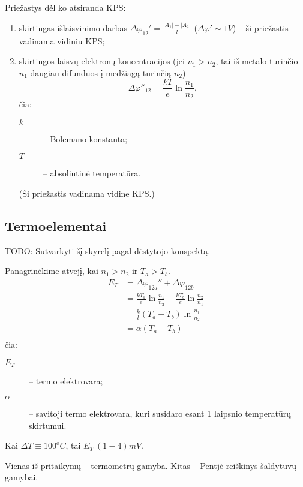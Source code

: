 Priežastys dėl ko atsiranda KPS:
\begin{enumerate}
  \item skirtingas išlaisvinimo darbas
    $\Delta \varphi_{12}' = \frac{|A_{1}| - |A_{2}|}{l}$
    ($\Delta \varphi' \sim 1 V$) – ši priežastis vadinama vidiniu KPS;
  \item skirtingos laisvų elektronų koncentracijos (jei $n_{1} > n_{2}$,
    tai iš metalo turinčio $n_{1}$ daugiau difunduos į medžiagą
    turinčią $n_{2}$)
  \begin{equation*}
    \Delta \varphi''_{12} = \frac{kT}{e}\ln\frac{n_{1}}{n_{2}},
  \end{equation*}
  čia:
  \begin{description}
    \item[$k$] – Bolcmano konstanta;
    \item[$T$] – absoliutinė temperatūra.
  \end{description}
  (Ši priežastis vadinama vidine KPS.)
\end{enumerate}

\subsection{Termoelementai}

TODO: Sutvarkyti šį skyrelį pagal dėstytojo konspektą.

Panagrinėkime atvejį, kai $n_{1} > n_{2}$ ir $T_{a} > T_{b}$.
\begin{align*}
  E_{T}
  &= \Delta \varphi_{12a}'' + \Delta \varphi_{12b} \\
  &= \frac{kT_{a}}{e}\ln\frac{n_{1}}{n_{2}} +
    \frac{kT_{b}}{e}\ln\frac{n_{2}}{n_{1}} \\
  &= \frac{k}{l} \left( T_{a} - T_{b} \right) \ln \frac{n_{1}}{n_{2}} \\
  &= \alpha (T_{a} - T_{b}) \\
\end{align*}
čia:
\begin{description}
  \item[$E_{T}$] – termo elektrovara;
  \item[$\alpha$] – savitoji termo elektrovara, kuri susidaro esant
    1 laipsnio temperatūrų skirtumui.
\end{description}

Kai $\Delta T \equiv 100^{o}C$, tai $E_{T} ~ (1-4)mV$.

Vienas iš pritaikymų – termometrų gamyba. Kitas – Pentjė reiškinys
šaldytuvų gamybai.

